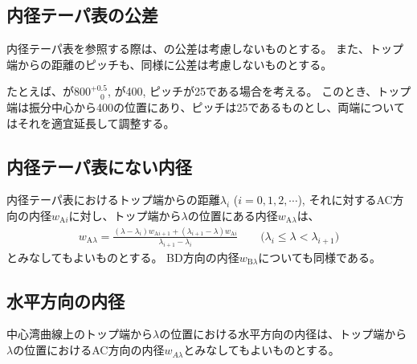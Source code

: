 \subsection{内径テーパ表の公差}
内径テーパ表を参照する際は、\WorkTotalLength の公差は考慮しないものとする。
また、トップ端からの距離のピッチも、同様に公差は考慮しないものとする。
\begin{hosoku}
たとえば、\WorkTotalLength が$800^{+0.5}_{\phantom -0}$, \TopAlocationLength が400, ピッチが25である場合を考える。
このとき、トップ端は振分中心から400の位置にあり、ピッチは25であるものとし、両端についてはそれを適宜延長して調整する。
\end{hosoku}

\subsection{内径テーパ表にない内径}
内径テーパ表におけるトップ端からの距離$\lambda_i$ ($i = 0, 1, 2, \cdots$), それに対するAC方向の内径$w_{\mathrm Ai}$に対し、トップ端から$\lambda$の位置にある内径$w_{\mathrm A\lambda}$は、
\begin{align*}
  w_{\mathrm A\lambda}
  = \frac{(\lambda-\lambda_i)w_{\mathrm Ai+1}+(\lambda_{i+1}-\lambda)w_{\mathrm Ai}}{\lambda_{i+1}-\lambda_i}
  \qquad
  \Big(\lambda_i \leq \lambda < \lambda_{i+1}\Big)
\end{align*}
とみなしてもよいものとする。
BD方向の内径$w_{\mathrm B\lambda}$についても同様である。

\subsection{水平方向の内径}
中心湾曲線上のトップ端から$\lambda$の位置における水平方向の内径は、トップ端から$\lambda$の位置におけるAC方向の内径$w_{A\lambda}$とみなしてもよいものとする。

